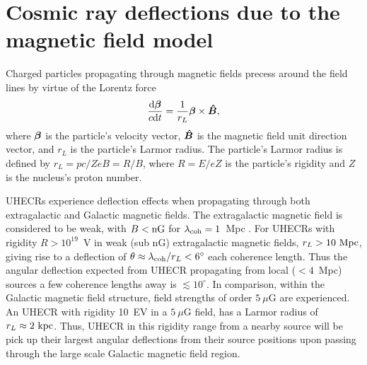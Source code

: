 \documentclass[usenatbib]{mnras}
\newcommand{\Vasu}[1]{{\color{purple}#1}}
\newcommand{\bfm}[1]{\mbox{\boldmath$ #1 $}}
\begin{document}


\section{Cosmic ray deflections due to the magnetic field model}
\label{Deflections}

Charged particles propagating through magnetic fields precess around the field lines by virtue of the Lorentz force 
\begin{eqnarray}
\frac{{\rm d}\bfm{\beta}}{c{\rm d}t} = \frac{1}{r_{L}}\bfm{\beta}\times \bfm{\hat{B}}, 
\end{eqnarray}
where $\bfm{\beta}$ is the particle's velocity vector, $\bfm{\hat{B}}$ is the magnetic field unit direction vector, and $r_{L}$ is the particle's Larmor radius. The particle's Larmor radius is defined by $r_{L}=pc/ZeB=R/B$, where $R=E/eZ $ is the particle's rigidity and $Z$ is the nucleus's proton number. 

UHECRs experience deflection effects when propagating through both extragalactic and Galactic magnetic fields. The extragalactic magnetic field is considered to be weak, with $B < \rm {nG}$ for $\lambda_{\rm coh}=1$~Mpc \citep{Blasi_1999, Kronberg_2007}. For UHECRs with rigidity $R > 10^{19}$~V in weak (sub nG) extragalactic magnetic fields, $r_{L}>{\rm 10~Mpc}$, giving rise to a deflection of $\theta\approx \lambda_{\rm coh}/r_{L}<6^{\circ}$ each coherence length. Thus the angular deflection expected from UHECR propagating from local ($<4$~Mpc) sources a few coherence lengths away is $\lesssim 10^{\circ}$. In comparison, within the Galactic magnetic field structure, field strengths of order $5~\mu$G are experienced. An UHECR with rigidity 10~EV in a $5~\mu$G field, has a Larmor radius of $r_L \approx 2 ~ \rm kpc$. Thus, UHECR in this rigidity range from a nearby source will be pick up their largest angular deflections from their source positions upon passing through the large scale Galactic magnetic field region.
\end{document}
